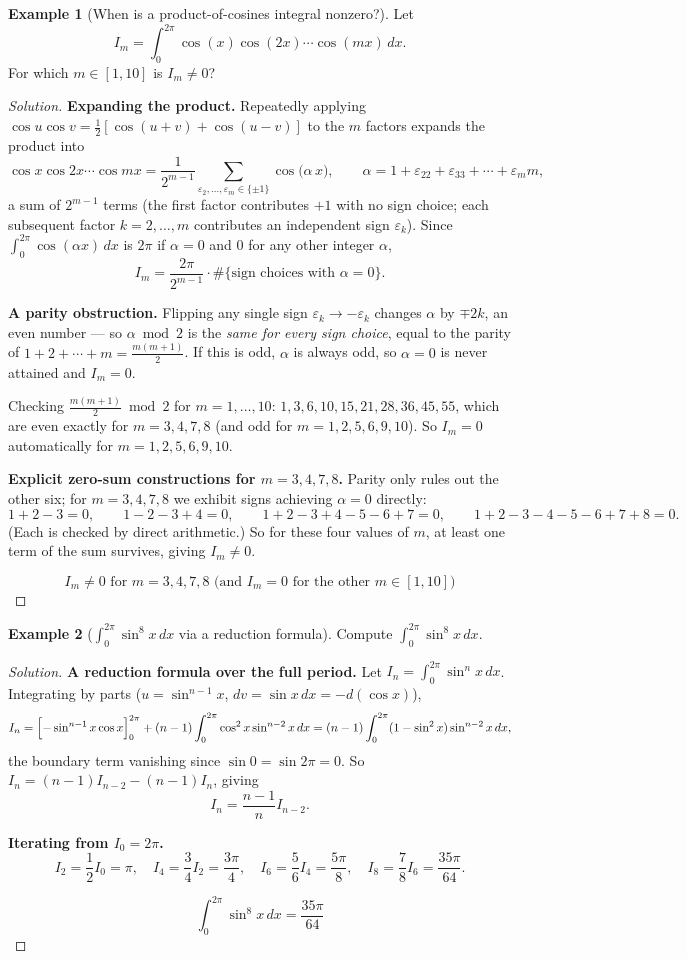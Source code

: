 \documentclass[11pt]{article}
\theoremstyle{definition}
\newtheorem{example}{Example}[section]
\begin{document}
\begin{example}[When is a product-of-cosines integral nonzero?]
Let
\[
I_m=\int_0^{2\pi}\cos(x)\cos(2x)\cdots\cos(mx)\,dx.
\]
For which $m\in[1,10]$ is $I_m\ne0$?
\end{example}
\begin{proof}[Solution]
\textbf{Expanding the product.} Repeatedly applying $\cos u\cos v=\tfrac12[\cos(u+v)+\cos(u-v)]$ to the $m$ factors expands the product into
\[
\cos x\cos2x\cdots\cos mx=\frac1{2^{m-1}}\sum_{\varepsilon_2,\dots,\varepsilon_m\in\{\pm1\}}\cos\bigl(\alpha\,x\bigr),\qquad \alpha=1+\varepsilon_22+\varepsilon_33+\cdots+\varepsilon_mm,
\]
a sum of $2^{m-1}$ terms (the first factor contributes $+1$ with no sign choice; each subsequent factor $k=2,\dots,m$ contributes an independent sign $\varepsilon_k$). Since $\int_0^{2\pi}\cos(\alpha x)\,dx$ is $2\pi$ if $\alpha=0$ and $0$ for any other integer $\alpha$,
\[
I_m=\frac{2\pi}{2^{m-1}}\cdot\#\{\text{sign choices with }\alpha=0\}.
\]

\textbf{A parity obstruction.} Flipping any single sign $\varepsilon_k\to-\varepsilon_k$ changes $\alpha$ by $\mp2k$, an even number — so $\alpha\bmod2$ is the \emph{same for every sign choice}, equal to the parity of $1+2+\cdots+m=\tfrac{m(m+1)}2$. If this is odd, $\alpha$ is always odd, so $\alpha=0$ is never attained and $I_m=0$.

Checking $\tfrac{m(m+1)}2\bmod2$ for $m=1,\dots,10$: $1,3,6,10,15,21,28,36,45,55$, which are even exactly for $m=3,4,7,8$ (and odd for $m=1,2,5,6,9,10$). So $I_m=0$ automatically for $m=1,2,5,6,9,10$.

\textbf{Explicit zero-sum constructions for $m=3,4,7,8$.} Parity only rules out the other six; for $m=3,4,7,8$ we exhibit signs achieving $\alpha=0$ directly:
\[
1+2-3=0,\qquad 1-2-3+4=0,\qquad 1+2-3+4-5-6+7=0,\qquad 1+2-3-4-5-6+7+8=0.
\]
(Each is checked by direct arithmetic.) So for these four values of $m$, at least one term of the sum survives, giving $I_m\ne0$.

\[
\boxed{I_m\ne0\text{ for }m=3,4,7,8\text{ (and }I_m=0\text{ for the other }m\in[1,10])}
\]
\end{proof}

\begin{example}[$\int_0^{2\pi}\sin^8x\,dx$ via a reduction formula]
Compute $\displaystyle\int_0^{2\pi}\sin^8x\,dx$.
\end{example}
\begin{proof}[Solution]
\textbf{A reduction formula over the full period.} Let $I_n=\int_0^{2\pi}\sin^nx\,dx$. Integrating by parts ($u=\sin^{n-1}x$, $dv=\sin x\,dx=-d(\cos x)$),
\[
I_n=\Bigl[-\sin^{n-1}x\cos x\Bigr]_0^{2\pi}+(n-1)\int_0^{2\pi}\cos^2x\sin^{n-2}x\,dx=(n-1)\int_0^{2\pi}(1-\sin^2x)\sin^{n-2}x\,dx,
\]
the boundary term vanishing since $\sin0=\sin2\pi=0$. So $I_n=(n-1)I_{n-2}-(n-1)I_n$, giving
\[
I_n=\frac{n-1}nI_{n-2}.
\]

\textbf{Iterating from $I_0=2\pi$.}
\[
I_2=\frac12I_0=\pi,\quad I_4=\frac34I_2=\frac{3\pi}4,\quad I_6=\frac56I_4=\frac{5\pi}8,\quad I_8=\frac78I_6=\frac{35\pi}{64}.
\]

\[
\boxed{\int_0^{2\pi}\sin^8x\,dx=\frac{35\pi}{64}}
\]
\end{proof}
\end{document}

